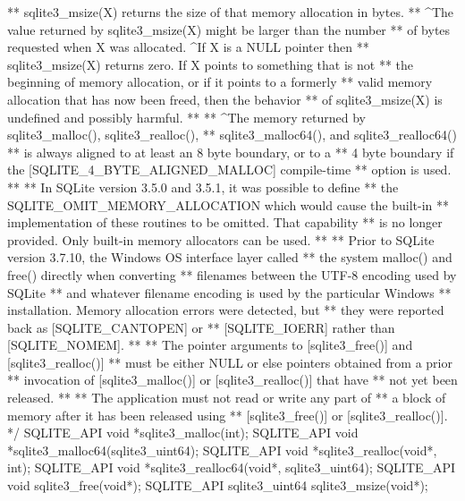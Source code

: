 \begin{Codex}[label=sqlite3.h,numbers=left]
{** sqlite3_msize(X) returns the size of that memory allocation in bytes.
** ^The value returned by sqlite3_msize(X) might be larger than the number
** of bytes requested when X was allocated.  ^If X is a NULL pointer then
** sqlite3_msize(X) returns zero.  If X points to something that is not
** the beginning of memory allocation, or if it points to a formerly
** valid memory allocation that has now been freed, then the behavior
** of sqlite3_msize(X) is undefined and possibly harmful.
**
** ^The memory returned by sqlite3_malloc(), sqlite3_realloc(),
** sqlite3_malloc64(), and sqlite3_realloc64()
** is always aligned to at least an 8 byte boundary, or to a
** 4 byte boundary if the [SQLITE_4_BYTE_ALIGNED_MALLOC] compile-time
** option is used.
**
** In SQLite version 3.5.0 and 3.5.1, it was possible to define
** the SQLITE_OMIT_MEMORY_ALLOCATION which would cause the built-in
** implementation of these routines to be omitted.  That capability
** is no longer provided.  Only built-in memory allocators can be used.
**
** Prior to SQLite version 3.7.10, the Windows OS interface layer called
** the system malloc() and free() directly when converting
** filenames between the UTF-8 encoding used by SQLite
** and whatever filename encoding is used by the particular Windows
** installation.  Memory allocation errors were detected, but
** they were reported back as [SQLITE_CANTOPEN] or
** [SQLITE_IOERR] rather than [SQLITE_NOMEM].
**
** The pointer arguments to [sqlite3_free()] and [sqlite3_realloc()]
** must be either NULL or else pointers obtained from a prior
** invocation of [sqlite3_malloc()] or [sqlite3_realloc()] that have
** not yet been released.
**
** The application must not read or write any part of
** a block of memory after it has been released using
** [sqlite3_free()] or [sqlite3_realloc()].
*/
SQLITE_API void *sqlite3_malloc(int);
SQLITE_API void *sqlite3_malloc64(sqlite3_uint64);
SQLITE_API void *sqlite3_realloc(void*, int);
SQLITE_API void *sqlite3_realloc64(void*, sqlite3_uint64);
SQLITE_API void sqlite3_free(void*);
SQLITE_API sqlite3_uint64 sqlite3_msize(void*);

}
\end{Codex}
